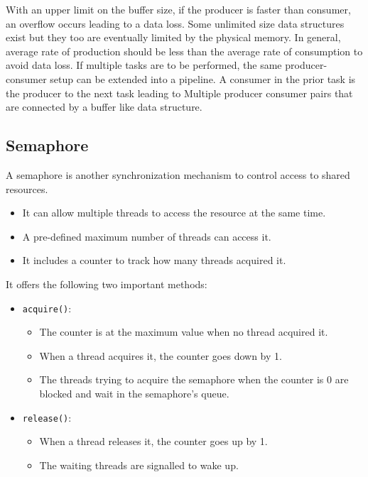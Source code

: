 \documentclass{scrartcl}
\begin{document}
With an upper limit on the buffer size, if the producer is faster than consumer, an overflow occurs leading to a data loss. Some unlimited size data structures exist but they too are eventually limited by the physical memory. In general, average rate of production should be less than the average rate of consumption to avoid data loss. If multiple tasks are to be performed, the same producer-consumer setup can be extended into a pipeline. A consumer in the prior task is the producer to the next task leading to Multiple producer consumer pairs that are connected by a buffer like data structure.

\subsection{Semaphore}
A semaphore is another synchronization mechanism to control access to shared resources. 

\begin{itemize}
    \item It can allow multiple threads to access the resource at the same time.
    \item A pre-defined maximum number of threads can access it.
    \item It includes a counter to track how many threads acquired it.
\end{itemize}

It offers the following two important methods:
\begin{itemize}
    \item \texttt{acquire()}:
    \begin{itemize}
        \item The counter is at the maximum value when no thread acquired it.
        \item When a thread acquires it, the counter goes down by 1.
        \item The threads trying to acquire the semaphore when the counter is 0 are blocked and wait in the semaphore's queue.
    \end{itemize}
    \item \texttt{release()}:
    \begin{itemize}
        \item When a thread releases it, the counter goes up by 1.
        \item The waiting threads are signalled to wake up.
    \end{itemize}
\end{itemize}
\end{document}
